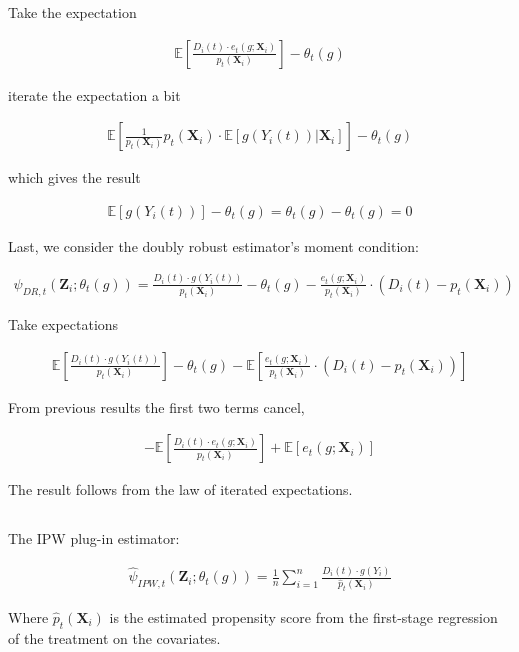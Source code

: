 \documentclass[12pt]{article}
\newcommand{\E}{\mathbb{E}}
\newcommand{\X}{\mathbf{X}}
\newcommand{\qsum}{\sum\limits_{i=1}^n}
\begin{document}
Take the expectation

\begin{align*}
\E \left[ \frac{D_i(t) \cdot e_t(g;\X_i)}{p_t(\X_i)}\right]  - \theta_t(g)
\end{align*}

iterate the expectation a bit

\begin{align*}
\E \left[ \frac{1}{p_t(\X_i)} p_t(\X_i) \cdot \E\left[ g(Y_i(t)) | \X_i \right] \right]  - \theta_t(g)
\end{align*}

which gives the result

\begin{align*}
\E\left[g(Y_i(t)) \right] - \theta_t(g) = \theta_t(g) -\theta_t(g) =0
\end{align*}

Last, we consider the doubly robust estimator's moment condition:

\begin{align*}
\psi_{DR,t}(\mathbf{Z}_i;\theta_t(g)) =  \frac{D_i(t) \cdot g(Y_i(t))}{p_t(\X_i)}- \theta_t(g) -  \frac{e_t(g;\X_i)}{p_t(\X_i)} \cdot (D_i(t) -  p_t(\X_i))
\end{align*}

Take expectations

\begin{align*}
 \E \left[\frac{D_i(t) \cdot g(Y_i(t))}{p_t(\X_i)} \right] - \theta_t(g) -  \E\left[\frac{e_t(g;\X_i)}{p_t(\X_i)} \cdot (D_i(t) -  p_t(\X_i))\right]
\end{align*}

From previous results the first two terms cancel,

\begin{align*}
- \E\left[\frac{D_i(t)\cdot e_t(g;\X_i) }{p_t(\X_i)} \right]  + \E \left[  e_t(g;\X_i) \right]
\end{align*}

The result follows from the law of iterated expectations.

\subsection{}
The IPW plug-in estimator:

\begin{align*}
\hat\psi_{IPW,t}(\mathbf{Z}_i;\theta_t(g)) = \frac{1}{n}\qsum\frac{D_i(t) \cdot g(Y_i) }{\hat p_t(\X_i)}
\end{align*}

Where $\hat p_t(\X_i)$ is the estimated propensity score from the first-stage regression of the treatment on the covariates.
\end{document}
